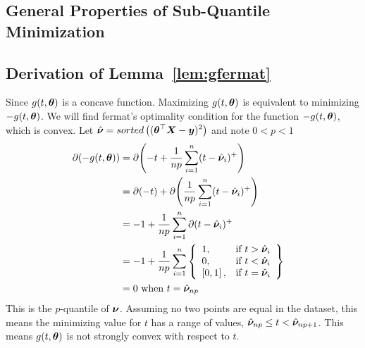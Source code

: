 \documentclass{article} %
\begin{document}
\begin{appendices}
	\newpage
	\section{General Properties of Sub-Quantile Minimization}\label{app:general-proofs}
	\subsection{Derivation of Lemma~\ref{lem:gfermat}}
	\label{app:gfermat}
	Since $\displaystyle g(t,{\bm{\theta}})$ is a concave function. Maximizing $g(t,{\bm{\theta}})$ is equivalent to minimizing $-g(t,{\bm{\theta}})$. We will find fermat's optimality condition for the function $\displaystyle -g(t,{\bm{\theta}})$, which is convex. 
	Let $\displaystyle \hat{{\bm{\nu}}} = sorted\left(({\bm{\theta}}^\top{\bm{X}} - {\bm{y}})^2\right)$ and note $\displaystyle 0 < p < 1$
	\begin{align}
		\partial{\displaystyle (-g(t,\boldsymbol{\theta}})) &= \partial{\left(-t + \frac{1}{np}\sum_{i=1}^{n}(t-\hat{{\bm{\nu}}}_i)^+\right)} &&\\
		&= \partial{(-t)} + \partial{\left(\frac{1}{np}\sum_{i=1}^{n}(t-\hat{{\bm{\nu}}}_i)^+\right)}&&\\
		&= -1 + \frac{1}{np}\sum_{i=1}^{n}\partial{(t-\hat{{\bm{\nu}}}_i)^+} &&\\
		&= -1 + \frac{1}{np}\sum_{i=1}^{n}
		\left\{
		\begin{array}{lr}
			1, & \text{if } t > \hat{{\bm{\nu}}}_i\\
			0, & \text{if } t < \hat{{\bm{\nu}}}_i \\
			\left[0,1\right], & \text{if } t = \hat{{\bm{\nu}}}_i \\
		\end{array}
		\right\}&&\\
		&= 0 \text{ when }\displaystyle t = \hat{{\bm{\nu}}}_{np}&&
	\end{align}
	This is the $p$-quantile of $\displaystyle {\bm{\nu}}$. Assuming no two points are equal in the dataset, this means the minimizing value for $t$ has a range of values, $\hat{{\bm{\nu}}}_{np} \leq t < \hat{{\bm{\nu}}}_{np+1}$. This means $g(t,{\bm{\theta}})$ is not strongly convex with respect to $t$. 

\end{appendices}
\end{document}
